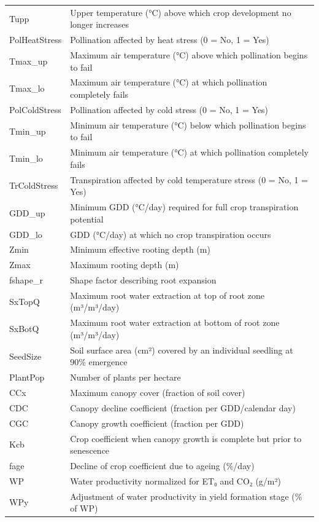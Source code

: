 \documentclass[
  letterpaper,
  DIV=11,
  numbers=noendperiod]{scrartcl}
\begin{document}
\begin{longtable}[]{@{}
  >{\raggedright\arraybackslash}p{}
  >{\raggedright\arraybackslash}p{}@{}}
Tupp & Upper temperature (°C) above which crop development no longer
increases \\
PolHeatStress & Pollination affected by heat stress (0 = No, 1 = Yes) \\
Tmax\_up & Maximum air temperature (°C) above which pollination begins
to fail \\
Tmax\_lo & Maximum air temperature (°C) at which pollination completely
fails \\
PolColdStress & Pollination affected by cold stress (0 = No, 1 = Yes) \\
Tmin\_up & Minimum air temperature (°C) below which pollination begins
to fail \\
Tmin\_lo & Minimum air temperature (°C) at which pollination completely
fails \\
TrColdStress & Transpiration affected by cold temperature stress (0 =
No, 1 = Yes) \\
GDD\_up & Minimum GDD (°C/day) required for full crop transpiration
potential \\
GDD\_lo & GDD (°C/day) at which no crop transpiration occurs \\
Zmin & Minimum effective rooting depth (m) \\
Zmax & Maximum rooting depth (m) \\
fshape\_r & Shape factor describing root expansion \\
SxTopQ & Maximum root water extraction at top of root zone
(m³/m³/day) \\
SxBotQ & Maximum root water extraction at bottom of root zone
(m³/m³/day) \\
SeedSize & Soil surface area (cm²) covered by an individual seedling at
90\% emergence \\
PlantPop & Number of plants per hectare \\
CCx & Maximum canopy cover (fraction of soil cover) \\
CDC & Canopy decline coefficient (fraction per GDD/calendar day) \\
CGC & Canopy growth coefficient (fraction per GDD) \\
Kcb & Crop coefficient when canopy growth is complete but prior to
senescence \\
fage & Decline of crop coefficient due to ageing (\%/day) \\
WP & Water productivity normalized for ET₀ and CO₂ (g/m²) \\
WPy & Adjustment of water productivity in yield formation stage (\% of
WP) \\

\end{longtable}
\end{document}
